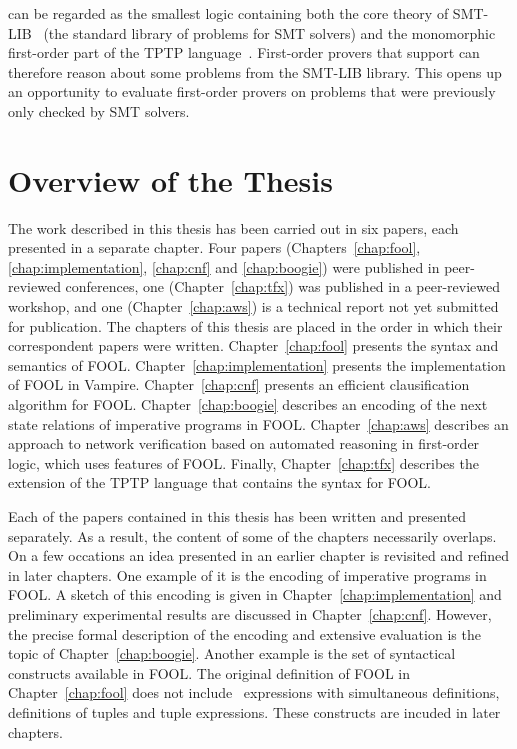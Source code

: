 {\folb{} can be regarded as the smallest logic containing both the core theory of SMT-LIB~\cite{SMT-LIB} (the standard library of problems for SMT solvers) and the monomorphic first-order part of the TPTP language~\cite{tff0}. First-order provers that support \folb{} can therefore reason about some problems from the SMT-LIB library. This opens up an opportunity to evaluate first-order provers on problems that were previously only checked by SMT solvers.
}

\section*{Overview of the Thesis}
\label{sect:intro:overview}

The work described in this thesis has been carried out in six papers, each presented in a separate chapter. Four papers (Chapters~\ref{chap:fool}, \ref{chap:implementation}, \ref{chap:cnf} and \ref{chap:boogie}) were published in peer-reviewed conferences, one (Chapter~\ref{chap:tfx}) was published in a peer-reviewed workshop, and one (Chapter~\ref{chap:aws}) is a technical report not yet submitted for publication. The chapters of this thesis are placed in the order in which their correspondent papers were written. Chapter~\ref{chap:fool} presents the syntax and semantics of FOOL. Chapter~\ref{chap:implementation} presents the implementation of FOOL in Vampire. Chapter~\ref{chap:cnf} presents an efficient clausification algorithm for FOOL. Chapter~\ref{chap:boogie} describes an encoding of the next state relations of imperative programs in FOOL. Chapter~\ref{chap:aws} describes an approach to network verification based on automated reasoning in first-order logic, which uses features of FOOL. Finally, Chapter~\ref{chap:tfx} describes the extension of the TPTP language that contains the syntax for FOOL.

Each of the papers contained in this thesis has been written and presented separately. As a result, the content of some of the chapters necessarily overlaps. On a few occations an idea presented in an earlier chapter is revisited and refined in later chapters. One example of it is the encoding of imperative programs in FOOL. A sketch of this encoding is given in Chapter~\ref{chap:implementation} and preliminary experimental results are discussed in Chapter~\ref{chap:cnf}. However, the precise formal description of the encoding and extensive evaluation is the topic of Chapter~\ref{chap:boogie}. Another example is the set of syntactical constructs available in FOOL. The original definition of FOOL in Chapter~\ref{chap:fool} does not include \LETIN\ expressions with simultaneous definitions, definitions of tuples and tuple expressions. These constructs are incuded in later chapters.

